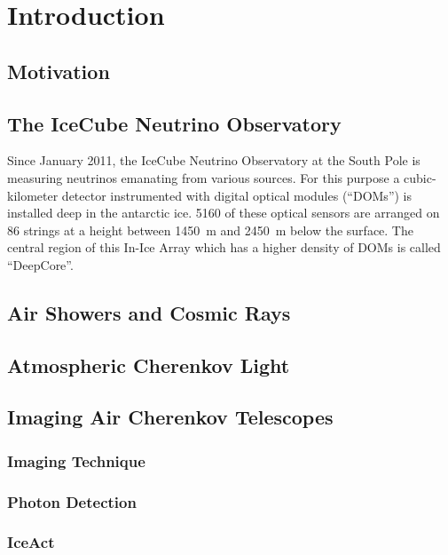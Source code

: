 \chapter{Introduction}

\section{Motivation}

\section{The IceCube Neutrino Observatory}

Since January 2011, the IceCube Neutrino Observatory at the South Pole is measuring neutrinos emanating from various sources. For this purpose a cubic-kilometer detector instrumented with digital optical modules (\enquote{DOMs}) is installed deep in the antarctic ice. 5160 of these optical sensors are arranged on 86 strings at a height between \SI{1450}{\meter} and \SI{2450}{\meter} below the surface. The central region of this In-Ice Array which has a higher density of DOMs is called \enquote{DeepCore}.





\section{Air Showers and Cosmic Rays}

\section{Atmospheric Cherenkov Light}

\section{Imaging Air Cherenkov Telescopes}

\subsection{Imaging Technique}

\subsection{Photon Detection}

\subsection{IceAct}